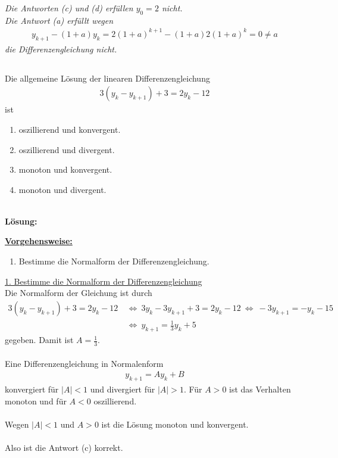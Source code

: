 \textit{Die Antworten (c) und (d) erfüllen $ y_0 =2 $ nicht.\\
Die Antwort (a) erfüllt wegen
\begin{align*}
y_{k+1} -(1+a) y_k = 2 (1+a)^{k+1} - (1+a) 2 (1+a)^k
= 0 \neq a
\end{align*}
die Differenzengleichung nicht.
}



\newpage



\subsection*{}
Die allgemeine Lösung der linearen Differenzengleichung
\begin{align*}
3 (y_k - y_{k+1})+ 3 = 2 y_k - 12 
\end{align*}
ist
\renewcommand{\labelenumi}{(\alph{enumi})}
\begin{enumerate}
	\item
	oszillierend und konvergent.
	\item
	oszillierend und divergent.	
	\item 
	monoton und konvergent.
	\item
	monoton und divergent.
\end{enumerate}
\ \\
\textbf{Lösung:}
\begin{mdframed}
\underline{\textbf{Vorgehensweise:}}
\renewcommand{\labelenumi}{\theenumi.}
\begin{enumerate}
\item Bestimme die Normalform der Differenzengleichung.
\end{enumerate}
\end{mdframed}

\underline{1. Bestimme die Normalform der Differenzengleichung}\\
Die Normalform der Gleichung ist durch
\begin{align*}
3 (y_k - y_{k+1})+ 3 = 2 y_k - 12 
\ &\Leftrightarrow  \
3 y_k - 3 y_{k+1} + 3 = 2 y_k -12 
\ \Leftrightarrow \
- 3 y_{k+1} = - y_k -15 \\
\ &\Leftrightarrow \
y_{k+1} = \frac{1}{3} y_k + 5
\end{align*}
gegeben. Damit ist $ A = \frac{1}{3} $.\\
\\ 
Eine Differenzengleichung in Normalenform
\begin{align*}
y_{k+1} = A y_{k} + B
\end{align*}
konvergiert für $ |A| < 1 $ und divergiert für $ |A| > 1 $.
Für $ A> 0 $ ist das Verhalten monoton und für $  A < 0 $ oszillierend.\\
\\ 
Wegen $ |A| < 1 $ und $ A > 0 $ ist die Lösung monoton und konvergent.\\
\\
Also ist die Antwort (c) korrekt.
\newpage

